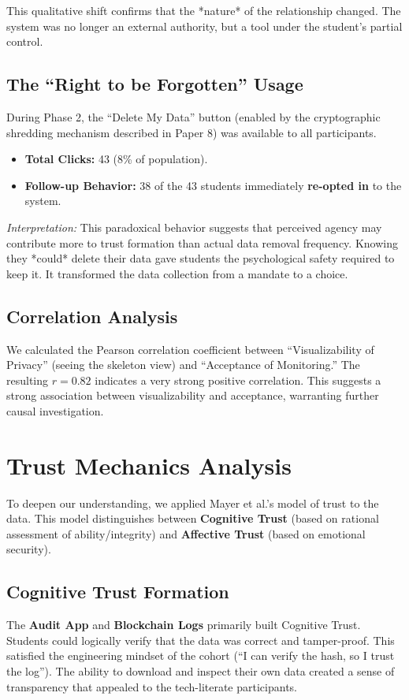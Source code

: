 \documentclass[conference]{IEEEtran}
\begin{document}
This qualitative shift confirms that the *nature* of the relationship changed. The system was no longer an external authority, but a tool under the student's partial control.

\subsection{The ``Right to be Forgotten'' Usage}
During Phase 2, the ``Delete My Data'' button (enabled by the cryptographic shredding mechanism described in Paper 8) was available to all participants.
\begin{itemize}
    \item \textbf{Total Clicks:} 43 (8\% of population).
    \item \textbf{Follow-up Behavior:} 38 of the 43 students immediately \textbf{re-opted in} to the system.
\end{itemize}
\textit{Interpretation:} This paradoxical behavior suggests that perceived agency may contribute more to trust formation than actual data removal frequency. Knowing they *could* delete their data gave students the psychological safety required to keep it. It transformed the data collection from a mandate to a choice.

\subsection{Correlation Analysis}
We calculated the Pearson correlation coefficient between ``Visualizability of Privacy'' (seeing the skeleton view) and ``Acceptance of Monitoring.'' The resulting $r=0.82$ indicates a very strong positive correlation. This suggests a strong association between visualizability and acceptance, warranting further causal investigation.

\section{Trust Mechanics Analysis}

To deepen our understanding, we applied Mayer et al.'s model of trust to the data. This model distinguishes between \textbf{Cognitive Trust} (based on rational assessment of ability/integrity) and \textbf{Affective Trust} (based on emotional security).

\subsection{Cognitive Trust Formation}
The \textbf{Audit App} and \textbf{Blockchain Logs} primarily built Cognitive Trust. Students could logically verify that the data was correct and tamper-proof. This satisfied the engineering mindset of the cohort (``I can verify the hash, so I trust the log''). The ability to download and inspect their own data created a sense of transparency that appealed to the tech-literate participants.
\end{document}
